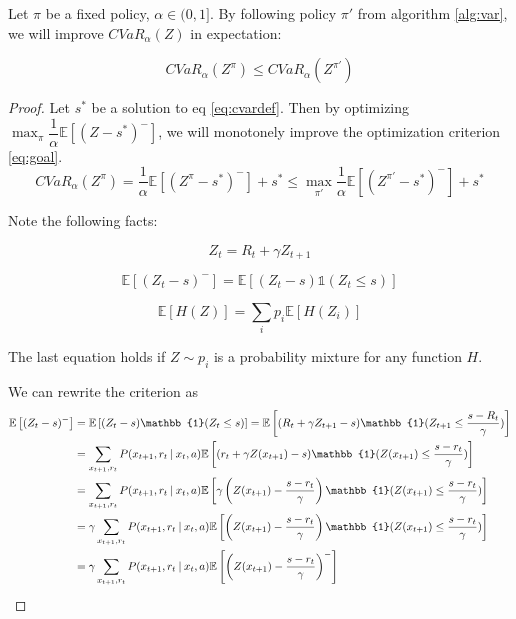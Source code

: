 \begin{theorem}
Let $\pi$ be a fixed policy, $\alpha \in (0, 1]$. By following policy $\pi'$ from algorithm \ref{alg:var}, we will improve $CVaR_\alpha(Z)$ in expectation:

$$CVaR_\alpha(Z^\pi) \le CVaR_\alpha(Z^{\pi'})$$
\end{theorem}

\begin{proof}

Let $s^*$ be a solution to eq \ref{eq:cvardef}. Then by optimizing $\max_\pi \dfrac{1}{\alpha}\mathbb{E}
\left[ (Z-s^*)^-\right]$, we will monotonely improve the optimization criterion \ref{eq:goal}.
$$
CVaR_\alpha(Z^{\pi}) = \dfrac{1}{\alpha}\mathbb{E}
\left[ (Z^\pi-s^*)^-\right] + s^* \le \max_{\pi'}\dfrac{1}{\alpha}\mathbb{E}
\left[ (Z^{\pi'}-s^*)^-\right] + s^*
$$

Note the following facts:

\begin{equation}
Z_t = R_t + \gamma Z_{t+1}
\end{equation}

\begin{equation}
\mathbb{E}\left[(Z_t-s)^-\right] = \mathbb{E}\left[(Z_t-s)\mathbb{1}(Z_t\le s)\right]
\end{equation}

\begin{equation}
\mathbb{E}[H(Z)] = \sum_i p_i \mathbb{E}[H(Z_i)]
\end{equation}

The last equation holds if $Z\sim p_i$ is a probability mixture for any function $H$.

We can rewrite the criterion as
\begin{equation}
\begin{split}
\mathbb{E}\left[(Z_t-s)^-\right] &= \mathbb{E}\left[(Z_t-s)\mathbb{1}(Z_t\le s)\right] = \mathbb{E}\left[(R_t + \gamma Z_{t+1}-s)\mathbb{1}(Z_{t+1}\le \dfrac{s - R_t}{\gamma})\right]\\
&= \sum_{x_{t+1}, r_t} P(x_{t+1}, r_t \given x_t, a)\mathbb{E}\left[(r_t + \gamma Z(x_{t+1})-s)\mathbb{1}(Z(x_{t+1})\le \dfrac{s - r_t}{\gamma})\right]\\
&= \sum_{x_{t+1}, r_t} P(x_{t+1}, r_t \given x_t, a)\mathbb{E}\left[\gamma\left(Z(x_{t+1})-\dfrac{s-r_t}{\gamma}\right)\mathbb{1}(Z(x_{t+1})\le \dfrac{s - r_t}{\gamma})\right]\\
&= \gamma\sum_{x_{t+1}, r_t} P(x_{t+1}, r_t \given x_t, a)\mathbb{E}\left[\left(Z(x_{t+1})-\dfrac{s-r_t}{\gamma}\right)\mathbb{1}(Z(x_{t+1})\le \dfrac{s - r_t}{\gamma})\right]\\
&= \gamma\sum_{x_{t+1}, r_t} P(x_{t+1}, r_t \given x_t, a)\mathbb{E}\left[\left(Z(x_{t+1}) - \dfrac{s - r_t}{\gamma}\right)^-\right]
\end{split}
\end{equation}



\end{proof}
